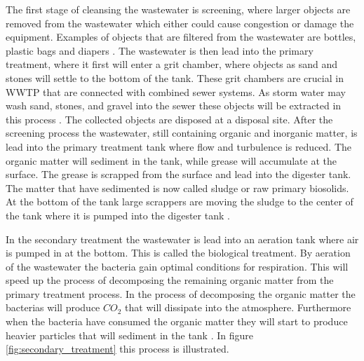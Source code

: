 The first stage of cleansing the wastewater is screening, where larger objects are removed from the wastewater which either could cause congestion or damage the equipment. Examples of objects that are filtered from the wastewater are bottles, plastic bags and diapers \cite{wwtp_process}. %
The wastewater is then lead into the primary treatment, where it first will enter a grit chamber, where objects as sand and stones will settle to the bottom of the tank. These grit chambers are crucial in WWTP that are connected with combined sewer systems. %
As storm water may wash sand, stones, and gravel into the sewer these objects will be extracted in this process \cite{epa_wwtp}. The collected objects are disposed at a disposal site. 
After the screening process the wastewater, still containing organic and inorganic matter, is lead into the primary treatment tank where flow and turbulence is reduced.
The organic matter will sediment in the tank, while grease will accumulate at the surface. 
The grease is scrapped from the surface and lead into the digester tank. The matter that have sedimented is now called sludge or raw primary biosolids. At the bottom of the tank large scrappers are moving the sludge to the center of the tank where it is pumped into the digester tank \cite{epa_wwtp}.%

In the secondary treatment the wastewater is lead into an aeration tank where air is pumped in at the bottom. This is called the biological treatment. By aeration of the wastewater the bacteria gain optimal conditions for respiration. This will speed up the process of decomposing the remaining organic matter from the primary treatment process. In the process of decomposing the organic matter the bacterias will produce $CO_2$ that will dissipate into the atmosphere. Furthermore when the bacteria have consumed the organic matter they will start to produce heavier particles that will sediment in the tank \cite{wwtp_ekstra}. In figure \ref{fig:secondary_treatment} this process is illustrated.



